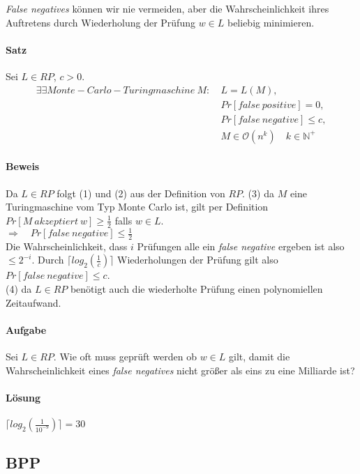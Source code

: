 \emph{False negatives} können wir nie vermeiden, aber die Wahrscheinlichkeit ihres Auftretens durch Wiederholung der Prüfung $w \in L$ beliebig minimieren.

\paragraph{Satz}
Sei $L \in RP$, $c > 0$.
\setcounter{equation}{0}
\begin{alignat}
	\exists \exists Monte-Carlo-Turingmaschine\ M:\ 
	& L = L(M), \\
	& Pr[false\ positive] = 0, \\
	& Pr[false\ negative] \leq c, \\
	& M \in \mathcal{O}(n^k) \quad k \in \mathbb{N}^+ 
\end{alignat}

\paragraph{Beweis}
Da $L \in RP$ folgt (1) und (2) aus der Definition von $RP$.
(3) da $M$ eine Turingmaschine vom Typ Monte Carlo ist, gilt per Definition $Pr[M\ akzeptiert\ w] \geq \frac{1}{2}$ falls $w \in L$. \\
$\Rightarrow \quad Pr[false\ negative] \leq \frac{1}{2}$ \\
Die Wahrscheinlichkeit, dass $i$ Prüfungen alle ein \emph{false negative} ergeben ist also $\leq 2^{-i}$. 
Durch $\lceil log_{2}(\frac{1}{c}) \rceil$ Wiederholungen der Prüfung gilt also $Pr[false\ negative] \leq c$. \\
(4) da $L \in RP$ benötigt auch die wiederholte Prüfung einen polynomiellen Zeitaufwand.

\paragraph{Aufgabe}
Sei $L \in RP$. Wie oft muss geprüft werden ob $w \in L$ gilt, damit die Wahrscheinlichkeit eines \emph{false negatives} nicht größer als eins zu eine Milliarde ist?

\paragraph{Lösung}
$\lceil log_{2}(\frac{1}{10^{-9}}) \rceil = 30$

\subsection{BPP}

